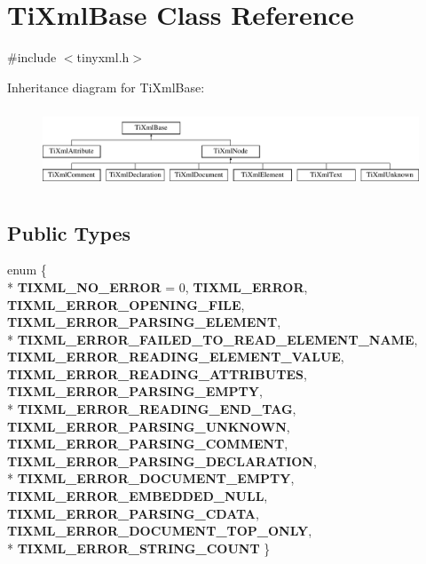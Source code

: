 \hypertarget{classTiXmlBase}{\section{Ti\-Xml\-Base Class Reference}
\label{classTiXmlBase}
}


{\ttfamily \#include $<$tinyxml.\-h$>$}

Inheritance diagram for Ti\-Xml\-Base\-:\begin{figure}[H]
\begin{center}
\leavevmode
\includegraphics[height=2.413793cm]{classTiXmlBase}
\end{center}
\end{figure}
\subsection*{Public Types}
\begin{DoxyCompactItemize}
\item 
enum \{ \\*
{\bfseries T\-I\-X\-M\-L\-\_\-\-N\-O\-\_\-\-E\-R\-R\-O\-R} = 0, 
{\bfseries T\-I\-X\-M\-L\-\_\-\-E\-R\-R\-O\-R}, 
{\bfseries T\-I\-X\-M\-L\-\_\-\-E\-R\-R\-O\-R\-\_\-\-O\-P\-E\-N\-I\-N\-G\-\_\-\-F\-I\-L\-E}, 
{\bfseries T\-I\-X\-M\-L\-\_\-\-E\-R\-R\-O\-R\-\_\-\-P\-A\-R\-S\-I\-N\-G\-\_\-\-E\-L\-E\-M\-E\-N\-T}, 
\\*
{\bfseries T\-I\-X\-M\-L\-\_\-\-E\-R\-R\-O\-R\-\_\-\-F\-A\-I\-L\-E\-D\-\_\-\-T\-O\-\_\-\-R\-E\-A\-D\-\_\-\-E\-L\-E\-M\-E\-N\-T\-\_\-\-N\-A\-M\-E}, 
{\bfseries T\-I\-X\-M\-L\-\_\-\-E\-R\-R\-O\-R\-\_\-\-R\-E\-A\-D\-I\-N\-G\-\_\-\-E\-L\-E\-M\-E\-N\-T\-\_\-\-V\-A\-L\-U\-E}, 
{\bfseries T\-I\-X\-M\-L\-\_\-\-E\-R\-R\-O\-R\-\_\-\-R\-E\-A\-D\-I\-N\-G\-\_\-\-A\-T\-T\-R\-I\-B\-U\-T\-E\-S}, 
{\bfseries T\-I\-X\-M\-L\-\_\-\-E\-R\-R\-O\-R\-\_\-\-P\-A\-R\-S\-I\-N\-G\-\_\-\-E\-M\-P\-T\-Y}, 
\\*
{\bfseries T\-I\-X\-M\-L\-\_\-\-E\-R\-R\-O\-R\-\_\-\-R\-E\-A\-D\-I\-N\-G\-\_\-\-E\-N\-D\-\_\-\-T\-A\-G}, 
{\bfseries T\-I\-X\-M\-L\-\_\-\-E\-R\-R\-O\-R\-\_\-\-P\-A\-R\-S\-I\-N\-G\-\_\-\-U\-N\-K\-N\-O\-W\-N}, 
{\bfseries T\-I\-X\-M\-L\-\_\-\-E\-R\-R\-O\-R\-\_\-\-P\-A\-R\-S\-I\-N\-G\-\_\-\-C\-O\-M\-M\-E\-N\-T}, 
{\bfseries T\-I\-X\-M\-L\-\_\-\-E\-R\-R\-O\-R\-\_\-\-P\-A\-R\-S\-I\-N\-G\-\_\-\-D\-E\-C\-L\-A\-R\-A\-T\-I\-O\-N}, 
\\*
{\bfseries T\-I\-X\-M\-L\-\_\-\-E\-R\-R\-O\-R\-\_\-\-D\-O\-C\-U\-M\-E\-N\-T\-\_\-\-E\-M\-P\-T\-Y}, 
{\bfseries T\-I\-X\-M\-L\-\_\-\-E\-R\-R\-O\-R\-\_\-\-E\-M\-B\-E\-D\-D\-E\-D\-\_\-\-N\-U\-L\-L}, 
{\bfseries T\-I\-X\-M\-L\-\_\-\-E\-R\-R\-O\-R\-\_\-\-P\-A\-R\-S\-I\-N\-G\-\_\-\-C\-D\-A\-T\-A}, 
{\bfseries T\-I\-X\-M\-L\-\_\-\-E\-R\-R\-O\-R\-\_\-\-D\-O\-C\-U\-M\-E\-N\-T\-\_\-\-T\-O\-P\-\_\-\-O\-N\-L\-Y}, 
\\*
{\bfseries T\-I\-X\-M\-L\-\_\-\-E\-R\-R\-O\-R\-\_\-\-S\-T\-R\-I\-N\-G\-\_\-\-C\-O\-U\-N\-T}
 \}
\end{DoxyCompactItemize}
